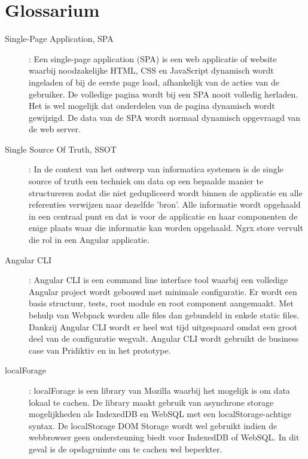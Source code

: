 
\chapter{Glossarium}
\label{ch:glossarium}


\begin{description}
\item[Single-Page Application, SPA]: Een single-page application (SPA) is een web applicatie of website waarbij noodzakelijke HTML, CSS en JavaScript dynamisch wordt ingeladen of bij de eerste page load, afhankelijk van de acties van de gebruiker. De volledige pagina wordt bij een SPA nooit volledig herladen. Het is wel mogelijk dat onderdelen van de pagina dynamisch wordt gewijzigd. De data van de SPA wordt normaal dynamisch opgevraagd van de web server. 
\item[Single Source Of Truth, SSOT]: In de context van het ontwerp van informatica systemen is de single source of truth een techniek om data op een bepaalde manier te structureren zodat die niet gedupliceerd wordt binnen de applicatie en alle referenties verwijzen naar dezelfde 'bron'. Alle informatie wordt opgehaald in een centraal punt en dat is voor de applicatie en haar componenten de enige plaats waar die informatie kan worden opgehaald. Ngrx store vervult die rol in een Angular applicatie.
\item[Angular CLI]: Angular CLI is een command line interface tool waarbij een volledige Angular project wordt gebouwd met minimale configuratie. Er wordt een basis structuur, tests, root module en root component aangemaakt. Met behulp van Webpack worden alle files dan gebundeld in enkele static files. Dankzij Angular CLI wordt er heel wat tijd uitgespaard omdat een groot deel van de configuratie wegvalt. Angular CLI wordt gebruikt de business case van Pridiktiv en in het prototype.
\item[localForage]: localForage is een library van Mozilla waarbij het mogelijk is om data lokaal te cachen. De library maakt gebruik van asynchrone storage mogelijkheden als IndexedDB en WebSQL met een localStorage-achtige syntax. De localStorage DOM Storage wordt wel gebruikt indien de webbrowser geen ondersteuning biedt voor IndexedDB of WebSQL. In dit geval is de opslagruimte om te cachen wel beperkter.

\end{description}
